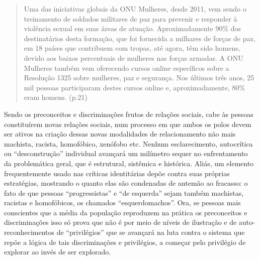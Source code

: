 \begin{quote}
Uma das iniciativas globais da ONU Mulheres, desde 2011, vem sendo o
treinamento de soldados militares de paz para prevenir e responder à
violência sexual em suas áreas de atuação. Aproximadamente 90\% dos
destinatários desta formação, que foi fornecida a milhares de forças de
paz, em 18 países que contribuem com tropas, até agora, têm sido homens,
devido aos baixos percentuais de mulheres nas forças armadas. A ONU
Mulheres também vem oferecendo cursos online específicos sobre a
Resolução 1325 sobre mulheres, paz e segurança. Nos últimos três anos,
25 mil pessoas participaram destes cursos online e, aproximadamente,
80\% eram homens. (p.21)
\end{quote}

Sendo os preconceitos e discriminações frutos de relações sociais, cabe
às pessoas constituírem novas relações sociais, num processo em que
ambos os polos devem ser ativos na criação dessas novas modalidades de
relacionamento não mais machista, racista, homofóbico, xenófobo etc.
Nenhum esclarecimento, autocrítica ou ``desconstrução'' individual
avançará um milímetro sequer no enfrentamento da problemática geral, que
é estrutural, sistêmica e histórica. Aliás, um elemento frequentemente
usado nas críticas identitárias depõe contra suas próprias estratégias,
mostrando o quanto elas são condenadas de antemão ao fracasso: o fato de
que pessoas ``progressistas'' e ``de esquerda'' sejam também machistas,
racistas e homofóbicos, os chamados ``esquerdomachos''. Ora, se pessoas
mais conscientes que a média da população reproduzem na prática os
preconceitos e discriminações isso só prova que não é por meio de níveis
de ilustração e de auto-reconhecimentos de ``privilégios'' que se
avançará na luta contra o sistema que repõe a lógica de tais
discriminações e privilégios, a começar pelo privilégio de explorar ao
invés de ser explorado.

